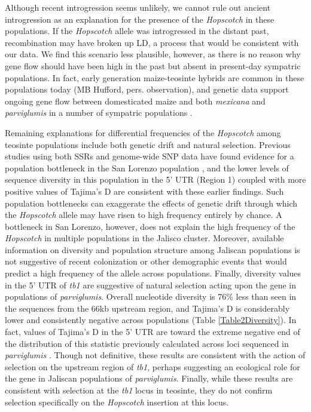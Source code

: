 \documentclass[11pt]{article} %
\begin{document}
\begin{linenumbers}
\begin{flushleft}
Although recent introgression seems unlikely, we cannot rule out ancient introgression as an explanation for the presence of the \emph{Hopscotch} in these populations. If the \emph{Hopscotch} allele was introgressed in the distant past, recombination may have broken up LD, a process that would be consistent with our data.  We find this scenario less plausible, however, as there is no reason why gene flow should have been high in the past but absent in present-day sympatric populations.  In fact, early generation maize-teosinte hybrids are common in these populations today (MB Hufford, pers. observation), and genetic data support ongoing gene flow between domesticated maize and both \emph{mexicana} and \emph{parviglumis} in a number of sympatric populations \citep{Hufford2013, Ellstrand2007, VanHeerwaarden2011, Warburton2011}. 

Remaining explanations for differential frequencies of the \emph{Hopscotch} among teosinte populations include both genetic drift and natural selection.  Previous studies using both SSRs and genome-wide SNP data have found evidence for a population bottleneck in the San Lorenzo population \citep{Hufford2010, Pyhajarvi2013}, and the lower levels of sequence diversity in this population in the 5' UTR (Region 1) coupled with more positive values of Tajima's D are consistent with these earlier findings. Such population bottlenecks can exaggerate the effects of genetic drift through which the \emph{Hopscotch} allele may have risen to high frequency entirely by chance. A bottleneck in San Lorenzo, however, does not explain the high frequency of the \emph{Hopscotch} in multiple populations in the Jalisco cluster. Moreover, available information on diversity and population structure among Jaliscan populations \citep{Hufford2010, Pyhajarvi2013} is not suggestive of recent colonization or other demographic events that would predict a high frequency of the allele across populations. 
Finally, diversity values in the 5' UTR of \emph{tb1} are suggestive of natural selection acting upon the gene in populations of \emph{parviglumis}. Overall nucleotide diversity is 76\% less than seen in the sequences from the 66kb upstream region, and Tajima's D is considerably lower and consistently negative across populations (Table \ref{Table2Diversity}). In fact, values of Tajima's D in the 5' UTR are toward the extreme negative end of the distribution of this statistic previously calculated across loci sequenced in \emph{parviglumis} \citep{Wright27052005, Moeller01072007}. Though not definitive, these results are consistent with the action of selection on the upstream region of \emph{tb1}, perhaps suggesting an ecological role for the gene in Jaliscan populations of \emph{parviglumis}.  Finally, while these results are consistent with selection at the \emph{tb1} locus in teosinte, they do not confirm selection specifically on the \emph{Hopscotch} insertion at this locus.


\end{flushleft}
\end{linenumbers}
\end{document}
